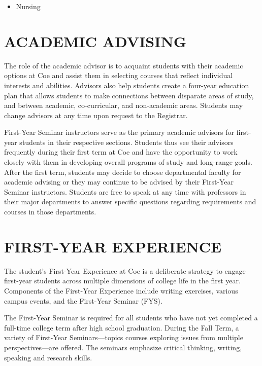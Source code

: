 \documentclass[
  letterpaper,
]{scrbook}
\providecommand{\tightlist}{%
  \setlength{\itemsep}{0pt}\setlength{\parskip}{0pt}}
\begin{document}
\begin{itemize}
\tightlist
\item
  Nursing
\end{itemize}

\hypertarget{sec-academic-advising}{%
\chapter{ACADEMIC ADVISING}\label{sec-academic-advising}}

The role of the academic advisor is to acquaint students with their
academic options at Coe and assist them in selecting courses that
reflect individual interests and abilities. Advisors also help students
create a four-year education plan that allows students to make
connections between disparate areas of study, and between academic,
co-curricular, and non-academic areas. Students may change advisors at
any time upon request to the Registrar.

First-Year Seminar instructors serve as the primary academic advisors
for first-year students in their respective sections. Students thus see
their advisors frequently during their first term at Coe and have the
opportunity to work closely with them in developing overall programs of
study and long-range goals. After the first term, students may decide to
choose departmental faculty for academic advising or they may continue
to be advised by their First-Year Seminar instructors. Students are free
to speak at any time with professors in their major departments to
answer specific questions regarding requirements and courses in those
departments.

\hypertarget{sec-first-year-experience}{%
\chapter{FIRST-YEAR EXPERIENCE}\label{sec-first-year-experience}}

The student's First-Year Experience at Coe is a deliberate strategy to
engage first-year students across multiple dimensions of college life in
the first year. Components of the First-Year Experience include writing
exercises, various campus events, and the First-Year Seminar (FYS).

The First-Year Seminar is required for all students who have not yet
completed a full-time college term after high school graduation. During
the Fall Term, a variety of First-Year Seminars---topics courses
exploring issues from multiple perspectives---are offered. The seminars
emphasize critical thinking, writing, speaking and research skills.
\end{document}
